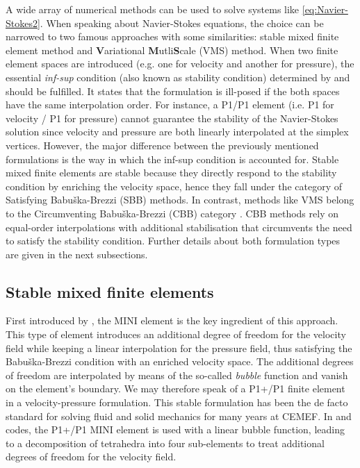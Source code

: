 A wide array of numerical methods can be used to solve systems like \cref{eq:Navier-Stokes2}. 
When speaking about Navier-Stokes equations, the choice can be narrowed to two famous
approaches with some similarities: stable mixed finite element method and \textbf{V}ariational \textbf{M}utli\textbf{S}cale (VMS) method.
When two finite element spaces are introduced (e.g. one for velocity and another for pressure), 
the essential \emph{inf-sup} condition (also known as stability condition) determined by \citet{babuska_error-bounds_1971} and \citet{brezzi_existence_1974} 
should be fulfilled. It states that the formulation is ill-posed if the both spaces have the same interpolation 
order. For instance, a P1/P1 element (i.e. P1 for velocity / P1 for pressure) cannot guarantee the stability of the Navier-Stokes solution since
velocity and pressure are both linearly interpolated at the simplex vertices.
However, the major difference between the previously mentioned formulations is the way in which the inf-sup condition is accounted for.
Stable mixed finite elements are stable because they directly respond to the stability condition by enriching the velocity space, 
hence they fall under the category of Satisfying Babuška-Brezzi (SBB) methods. In contrast, methods like VMS belong to the
Circumventing Babuška-Brezzi (CBB) category \citep{barbosa_finite_1991}.
CBB methods rely on equal-order interpolations with additional stabilisation that circumvents the need to satisfy the stability condition.
Further details about both formulation types are given in the next subsections.

\subsection{Stable mixed finite elements}

First introduced by \citet{arnold_stable_1984}, the MINI element is the key ingredient of this approach.
This type of element introduces an additional degree of freedom for the velocity field while keeping a linear
interpolation for the pressure field, thus satisfying the Babuška-Brezzi condition with an enriched velocity space.
The additional degrees of freedom are interpolated by means of the so-called \emph{bubble} function and vanish on the element's boundary.
We may therefore speak of a P1+/P1 finite element in a velocity-pressure formulation. 
This stable formulation has been the de facto standard for solving fluid 
and solid mechanics for many years at CEMEF. In \forge and \thercast codes, the P1+/P1 MINI element is used with a linear bubble function, leading to a 
decomposition of tetrahedra into four sub-elements to treat additional degrees of freedom for the velocity field.

